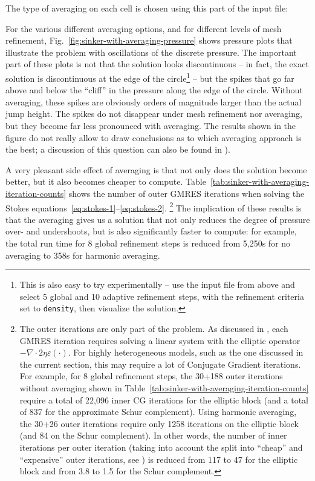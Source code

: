 \documentclass{article}
\begin{document}
The type of averaging on each cell is chosen using this part of the input file:

For the various different averaging options, and for different levels of mesh
refinement, Fig.~\ref{fig:sinker-with-averaging-pressure} shows
pressure plots that illustrate the problem with oscillations of the discrete
pressure. The important part of these plots is not that the solution looks
discontinuous -- in fact, the exact solution is discontinuous at the edge of the
circle\footnote{This is also easy to try experimentally -- use the input file
from above and select 5 global and 10 adaptive refinement steps, with the
refinement criteria set to \texttt{density}, then visualize the solution.} --
but the spikes that go far above and below the ``cliff'' in the pressure along 
the edge of the circle. Without averaging, these spikes are obviously orders 
of magnitude larger than the actual jump height. The spikes do not disappear 
under mesh refinement nor averaging, but they become far less pronounced with
averaging. The results shown in the figure do not really allow to draw
conclusions as to which averaging approach is the best; a discussion of this
question can also be found in \cite{Bab08,Deu08,DMGT11,TMK14}).

A very pleasant side effect of averaging is that not only does the solution
become better, but it also becomes cheaper to compute.
Table~\ref{tab:sinker-with-averaging-iteration-counts} shows the
number of outer GMRES iterations when solving the Stokes
equations~\eqref{eq:stokes-1}--\eqref{eq:stokes-2}.%
\footnote{The outer iterations are only part of the problem. As discussed in
  \cite{KHB12}, each GMRES iteration requires solving a linear system with the
  elliptic operator $-\nabla \cdot 2 \eta \varepsilon(\cdot)$. For highly
  heterogeneous models, such as the one discussed in the current section, this
  may require a lot of Conjugate Gradient iterations. For example, for 8
  global refinement steps, the 30+188 outer iterations without averaging shown
  in Table~\ref{tab:sinker-with-averaging-iteration-counts} require a total of
  22,096 inner CG iterations for the elliptic block (and a total of 837 for the
  approximate Schur complement). Using harmonic averaging, the 30+26 outer
  iterations require only 1258 iterations on the elliptic block (and 84 on the
  Schur complement). In other words, the number of inner iterations per outer
  iteration (taking into account the split into ``cheap'' and ``expensive''
  outer iterations, see \cite{KHB12}) is reduced from 117 to 47 for the
  elliptic block and from 3.8 to 1.5 for the Schur complement.}
The implication of these results is that the averaging gives us a solution
that not only reduces the degree of pressure over- and undershoots, but is also
significantly faster to compute: for example, the total run time for 8 global
refinement steps is reduced from 5,250s for no averaging to 358s for harmonic
averaging.
\end{document}
